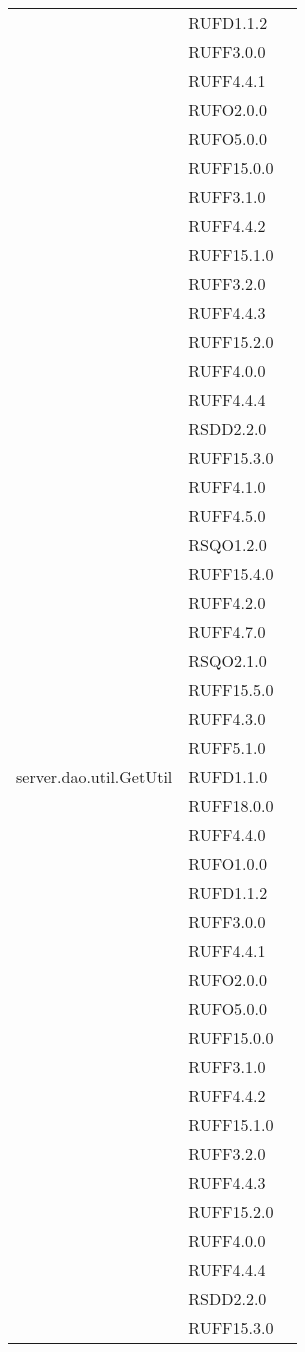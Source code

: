 \begin{center}
\begin{longtable}{lp{}l}
 & RUFD1.1.2 \\
 & RUFF3.0.0 \\
 & RUFF4.4.1 \\
 & RUFO2.0.0 \\
 & RUFO5.0.0 \\
 & RUFF15.0.0 \\
 & RUFF3.1.0 \\
 & RUFF4.4.2 \\
 & RUFF15.1.0 \\
 & RUFF3.2.0 \\
 & RUFF4.4.3 \\
 & RUFF15.2.0 \\
 & RUFF4.0.0 \\
 & RUFF4.4.4 \\
 & RSDD2.2.0 \\
 & RUFF15.3.0 \\
 & RUFF4.1.0 \\
 & RUFF4.5.0 \\
 & RSQO1.2.0 \\
 & RUFF15.4.0 \\
 & RUFF4.2.0 \\
 & RUFF4.7.0 \\
 & RSQO2.1.0 \\
 & RUFF15.5.0 \\
 & RUFF4.3.0 \\
 & RUFF5.1.0 \\
server.dao.util.GetUtil & RUFD1.1.0 \\
 & RUFF18.0.0 \\
 & RUFF4.4.0 \\
 & RUFO1.0.0 \\
 & RUFD1.1.2 \\
 & RUFF3.0.0 \\
 & RUFF4.4.1 \\
 & RUFO2.0.0 \\
 & RUFO5.0.0 \\
 & RUFF15.0.0 \\
 & RUFF3.1.0 \\
 & RUFF4.4.2 \\
 & RUFF15.1.0 \\
 & RUFF3.2.0 \\
 & RUFF4.4.3 \\
 & RUFF15.2.0 \\
 & RUFF4.0.0 \\
 & RUFF4.4.4 \\
 & RSDD2.2.0 \\
 & RUFF15.3.0 \\

\end{longtable}
\end{center}
